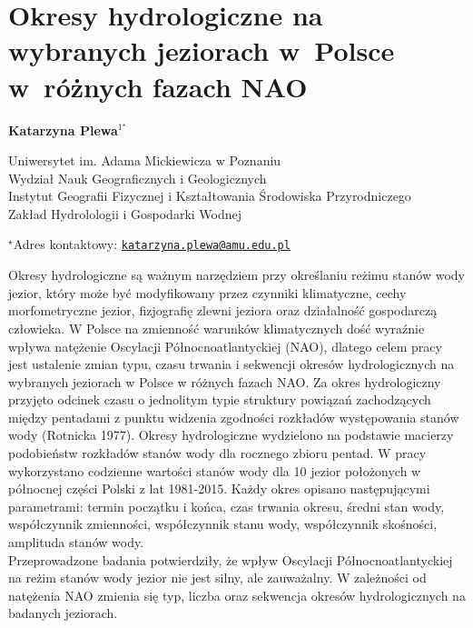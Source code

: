 \documentclass[\main/boa.tex]{subfiles}
\begin{document}
\section{Okresy hydrologiczne na wybranych jeziorach w~Polsce w~różnych fazach NAO}

\begin{center}
  {\bf {} Katarzyna Plewa$^{1^\star}$}
\end{center}

\vskip 0.3cm

\begin{affiliations}
\begin{enumerate}
\begin{minipage}{0.915\textwidth}
\centering
\item Uniwersytet im. Adama Mickiewicza w Poznaniu\\ Wydział Nauk Geograficznych i Geologicznych\\ Instytut Geografii Fizycznej i Kształtowania Środowiska Przyrodniczego \\Zakład Hydrolologii i Gospodarki Wodnej
\end{minipage}
\end{enumerate}
$^\star$Adres kontaktowy: \href{mailto:katarzyna.plewa@amu.edu.pl}{\nolinkurl{katarzyna.plewa@amu.edu.pl}}\\
\end{affiliations}

\vskip 0.5cm


\vskip 0.5cm

Okresy hydrologiczne są ważnym narzędziem przy określaniu reżimu stanów wody jezior, który może być modyfikowany przez czynniki klimatyczne, cechy morfometryczne jezior, fizjografię zlewni jeziora oraz działalność gospodarczą człowieka. W Polsce na zmienność warunków klimatycznych dość wyraźnie wpływa natężenie Oscylacji Północnoatlantyckiej (NAO), dlatego celem pracy jest ustalenie zmian typu, czasu trwania i sekwencji okresów hydrologicznych na wybranych jeziorach w Polsce w różnych fazach NAO. Za okres hydrologiczny przyjęto odcinek czasu o jednolitym typie struktury powiązań zachodzących między pentadami z punktu widzenia zgodności rozkładów występowania stanów wody (Rotnicka 1977). Okresy hydrologiczne wydzielono na podstawie macierzy podobieństw rozkładów stanów wody dla rocznego zbioru pentad. W pracy wykorzystano codzienne wartości stanów wody dla 10 jezior położonych w północnej części Polski z lat 1981-2015. Każdy okres opisano następującymi parametrami: termin początku i końca, czas trwania okresu, średni stan wody, współczynnik zmienności, współczynnik stanu wody, współczynnik skośności, amplituda stanów wody.\\
Przeprowadzone badania potwierdziły, że wpływ Oscylacji Północnoatlantyckiej na reżim stanów wody jezior nie jest silny, ale zauważalny. W zależności od natężenia NAO zmienia się typ, liczba oraz sekwencja okresów hydrologicznych na badanych jeziorach.
\end{document}
